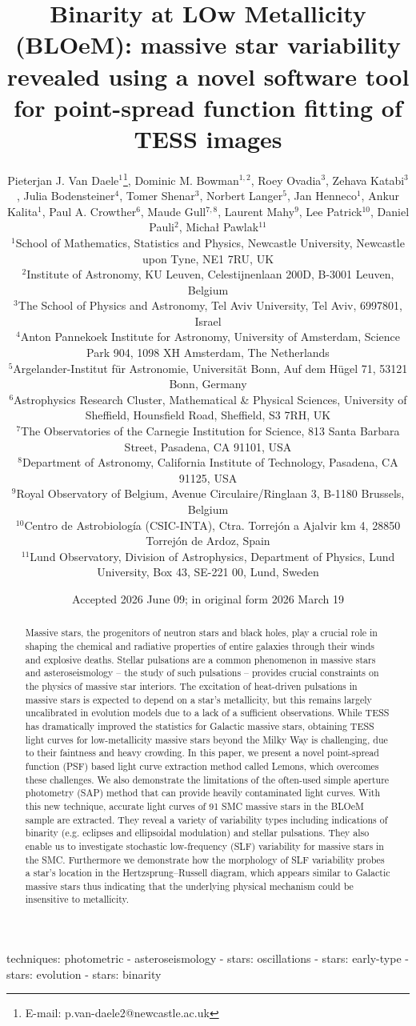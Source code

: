 \documentclass[fleqn,usenatbib]{mnras}
\title[TESS photometry of massive stars in the SMC]{Binarity at LOw Metallicity (BLOeM): massive star variability revealed using a novel software tool for point-spread function fitting of TESS images\\}
\author[P. Van Daele et al.]{%
Pieterjan J. Van Daele$^{1}$\thanks{E-mail: p.van-daele2@newcastle.ac.uk},
Dominic M. Bowman$^{1,2}$,
Roey Ovadia$^{3}$,
Zehava Katabi$^{3}$,
Julia Bodensteiner$^{4}$,
\newauthor
Tomer Shenar$^{3}$,
Norbert Langer$^{5}$,
Jan Henneco$^{1}$,
Ankur Kalita$^{1}$,
Paul A. Crowther$^{6}$,
Maude Gull$^{7,8}$,
\newauthor
Laurent Mahy$^{9}$,
Lee Patrick$^{10}$,
Daniel Pauli$^{2}$,
Micha{\l} Pawlak$^{11}$
\\
$^{1}$School of Mathematics, Statistics and Physics, Newcastle University, Newcastle upon Tyne, NE1 7RU, UK\\
$^{2}$Institute of Astronomy, KU Leuven, Celestijnenlaan 200D, B-3001 Leuven, Belgium \\
$^{3}$The School of Physics and Astronomy, Tel Aviv University, Tel Aviv, 6997801, Israel\\
$^{4}$Anton Pannekoek Institute for Astronomy, University of Amsterdam, Science Park 904, 1098 XH Amsterdam, The Netherlands\\
$^{5}$Argelander-Institut für Astronomie, Universität Bonn, Auf dem Hügel 71, 53121 Bonn, Germany\\
$^{6}$Astrophysics Research Cluster, Mathematical \& Physical Sciences, University of Sheffield, Hounsfield Road, Sheffield, S3 7RH, UK\\
$^{7}$The Observatories of the Carnegie Institution for Science, 813 Santa Barbara Street, Pasadena, CA 91101, USA\\
$^{8}$Department of Astronomy, California Institute of Technology, Pasadena, CA 91125, USA\\
$^{9}$Royal Observatory of Belgium, Avenue Circulaire/Ringlaan 3, B-1180 Brussels, Belgium\\
$^{10}$Centro de Astrobiología (CSIC-INTA), Ctra. Torrejón a Ajalvir km 4, 28850 Torrejón de Ardoz, Spain\\
$^{11}$Lund Observatory, Division of Astrophysics, Department of Physics, Lund University, Box 43, SE-221 00, Lund, Sweden\\
}
\date{Accepted 2026 June 09; in original form 2026 March 19}
\begin{document}
\label{firstpage}
\pagerange{\pageref{firstpage}--\pageref{lastpage}}
\maketitle

\begin{abstract}
Massive stars, the progenitors of neutron stars and black holes, play a crucial role in shaping the chemical and radiative properties of entire galaxies through their winds and explosive deaths. Stellar pulsations are a common phenomenon in massive stars and asteroseismology -- the study of such pulsations -- provides crucial constraints on the physics of massive star interiors. The excitation of heat-driven pulsations in massive stars is expected to depend on a star's metallicity, but this remains largely uncalibrated in evolution models due to a lack of a sufficient observations. While TESS has dramatically improved the statistics for Galactic massive stars, obtaining TESS light curves for low-metallicity massive stars beyond the Milky Way is challenging, due to their faintness and heavy crowding. In this paper, we present a novel point-spread function (PSF) based light curve extraction method called {\sc Lemons}, which overcomes these challenges. We also demonstrate the limitations of the often-used simple aperture photometry (SAP) method that can provide heavily contaminated light curves. With this new technique, accurate light curves of 91 SMC massive stars in the BLOeM sample are extracted. They reveal a variety of variability types including indications of binarity (e.g. eclipses and ellipsoidal modulation) and stellar pulsations. They also enable us to investigate stochastic low-frequency (SLF) variability for massive stars in the SMC. Furthermore we demonstrate how the morphology of SLF variability probes a star's location in the Hertzsprung--Russell diagram, which appears similar to Galactic massive stars thus indicating that the underlying physical mechanism could be insensitive to metallicity.

\end{abstract}

\begin{keywords}
 techniques: photometric -
 asteroseismology -
 stars: oscillations -
 stars: early-type -
 stars: evolution -
 stars: binarity 
\end{keywords}
\end{document}
